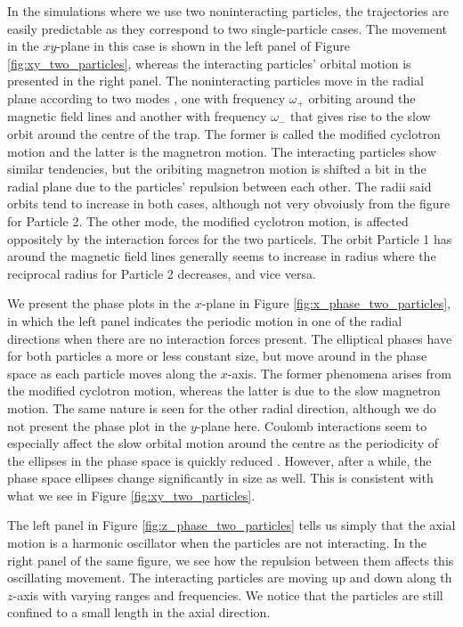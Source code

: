 In the simulations where we use two noninteracting particles, the trajectories are easily predictable as they correspond to two single-particle cases. The movement in the $xy$-plane in this case is shown in the left panel of Figure \ref{fig:xy_two_particles}, whereas the interacting particles' orbital motion is presented in the right panel. The noninteracting particles move in the radial plane according to two modes , one with frequency $\omega_+$ orbiting around the magnetic field lines and another with frequency $\omega_-$ that gives rise to the slow orbit around the centre of the trap. The former is called the modified cyclotron motion and the latter is the magnetron motion. The interacting particles show similar tendencies, but the oribiting magnetron motion is shifted a bit in the radial plane due to the particles' repulsion between each other. The radii said orbits tend to increase in both cases, although not very obvoiusly from the figure for Particle 2. The other mode, the modified cyclotron motion, is affected oppositely by the interaction forces for the two particels. The orbit Particle 1 has around the magnetic field lines generally seems to increase in radius where the reciprocal radius for Particle 2 decreases, and vice versa.


We present the phase plots in the $x$-plane in Figure \ref{fig:x_phase_two_particles}, in which the left panel indicates the periodic motion in one of the radial directions when there are no interaction forces present. The elliptical phases have for both particles a more or less constant size, but move around in the phase space as each particle moves along the $x$-axis. The former phenomena arises from the modified cyclotron motion, whereas the latter is due to the slow magnetron motion. The same nature is seen for the other radial direction, although we do not present the phase plot in the $y$-plane here. Coulomb interactions seem to especially affect the slow orbital motion around the centre as the periodicity of the ellipses in the phase space is quickly reduced . However, after a while, the phase space ellipses change significantly in size as well. This is consistent with what we see in Figure \ref{fig:xy_two_particles}.  

The left panel in Figure \ref{fig:z_phase_two_particles} tells us simply that the axial motion is a harmonic oscillator  when the particles are not interacting. In the right panel of the same figure, we see how the repulsion between them affects this oscillating movement. The interacting particles are moving up and down along th $z$-axis with varying ranges and frequencies. We notice that the particles are still confined to a small length in the axial direction. 

